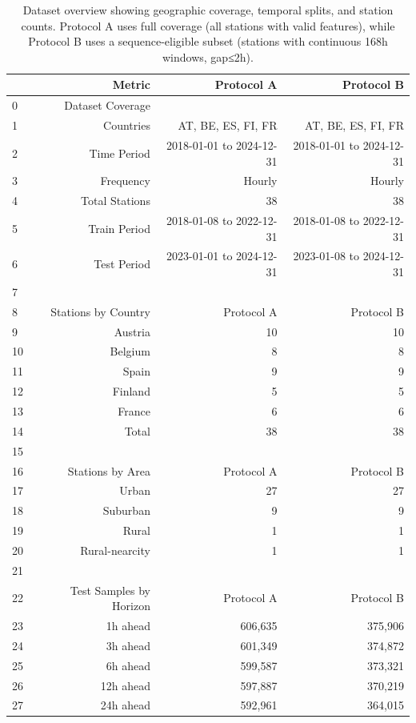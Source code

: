\begin{table}[htbp]
\centering
\caption{Dataset overview showing geographic coverage, temporal splits, and station counts. Protocol A uses full coverage (all stations with valid features), while Protocol B uses a sequence-eligible subset (stations with continuous 168h windows, gap≤2h).}
\label{tab:dataset_overview}
\begin{tabular}{lrrr}
\toprule
 & Metric & Protocol A & Protocol B \\
\midrule
0 & Dataset Coverage &  &  \\
1 & Countries & AT, BE, ES, FI, FR & AT, BE, ES, FI, FR \\
2 & Time Period & 2018-01-01 to 2024-12-31 & 2018-01-01 to 2024-12-31 \\
3 & Frequency & Hourly & Hourly \\
4 & Total Stations & 38 & 38 \\
5 & Train Period & 2018-01-08 to 2022-12-31 & 2018-01-08 to 2022-12-31 \\
6 & Test Period & 2023-01-01 to 2024-12-31 & 2023-01-08 to 2024-12-31 \\
7 &  &  &  \\
8 & Stations by Country & Protocol A & Protocol B \\
9 & Austria & 10 & 10 \\
10 & Belgium & 8 & 8 \\
11 & Spain & 9 & 9 \\
12 & Finland & 5 & 5 \\
13 & France & 6 & 6 \\
14 & Total & 38 & 38 \\
15 &  &  &  \\
16 & Stations by Area & Protocol A & Protocol B \\
17 & Urban & 27 & 27 \\
18 & Suburban & 9 & 9 \\
19 & Rural & 1 & 1 \\
20 & Rural-nearcity & 1 & 1 \\
21 &  &  &  \\
22 & Test Samples by Horizon & Protocol A & Protocol B \\
23 & 1h ahead & 606,635 & 375,906 \\
24 & 3h ahead & 601,349 & 374,872 \\
25 & 6h ahead & 599,587 & 373,321 \\
26 & 12h ahead & 597,887 & 370,219 \\
27 & 24h ahead & 592,961 & 364,015 \\
\bottomrule
\end{tabular}
\end{table}